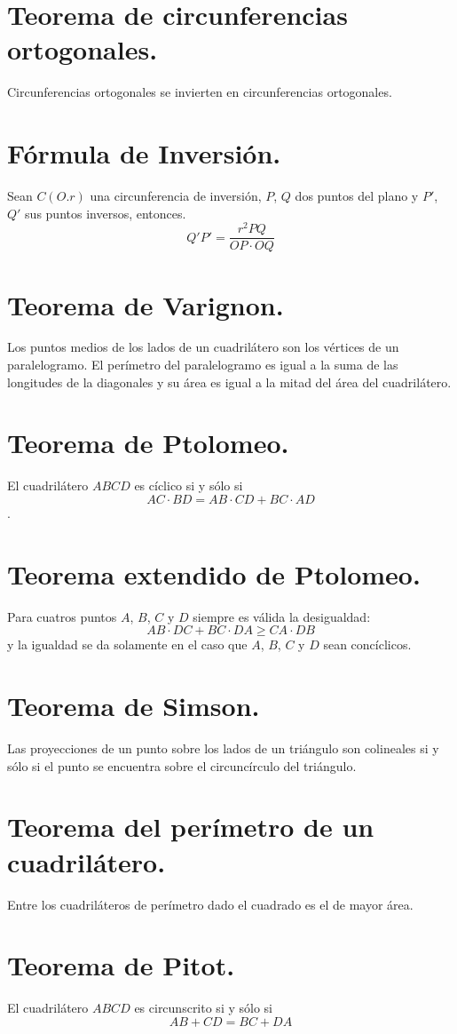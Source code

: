 \documentclass[12pt,a4paper,oneside]{book}
\begin{document}
\section{Teorema de circunferencias  ortogonales.}
Circunferencias ortogonales se invierten en circunferencias ortogonales.
\section{Fórmula de Inversión.}
Sean $C(O. r)$ una circunferencia de inversión, $P$, $Q$ dos puntos del plano y $P'$, $Q'$ sus puntos inversos, entonces.$$Q'P'= \dfrac{r^2PQ}{OP \cdot OQ}$$
\section{Teorema de Varignon.}
Los puntos medios de los lados de un cuadrilátero son los vértices de un paralelogramo. El perímetro del paralelogramo es igual a la suma de las longitudes de la diagonales y su área es igual a la mitad del área del cuadrilátero. 
\section{Teorema de Ptolomeo.}
El cuadrilátero $ABCD$ es cíclico si y sólo si $$AC \cdot BD = AB \cdot CD + BC \cdot AD$$.
\section{Teorema extendido de Ptolomeo.}
Para cuatros puntos $A$, $B$, $C$ y $D$ siempre es válida la desigualdad:$$AB \cdot DC + BC\cdot DA \geq CA \cdot DB$$ 
y la igualdad se da solamente en el caso que $A$, $B$, $C$ y $D$ sean concíclicos.
\section{Teorema de Simson.}
Las proyecciones de un punto sobre los lados de un triángulo son colineales si y sólo si el punto se encuentra sobre el circuncírculo del triángulo.
\section{Teorema del perímetro de un cuadrilátero.}
Entre los cuadriláteros de perímetro dado el cuadrado es el de mayor área.
\section{Teorema de Pitot.}
El cuadrilátero $ABCD$ es circunscrito si y sólo si $$AB + CD = BC +DA$$
\end{document}
